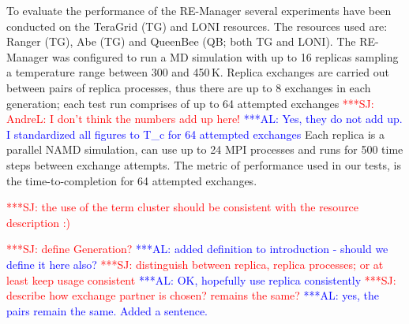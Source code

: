 \documentclass{rspublic}
\newcommand{\alnote}[1]{ {\textcolor{blue} { ***AL: #1 }}}
\newcommand{\jhanote}[1]{ {\textcolor{red} { ***SJ: #1 }}}
\newcommand{\alnote}[1]{}
\newcommand{\jhanote}[1]{}
\begin{document}
To evaluate the performance of the RE-Manager several experiments have
been conducted on the TeraGrid (TG) and LONI resources. The resources
used are: Ranger (TG), Abe (TG) and QueenBee (QB; both TG and LONI).
The RE-Manager was configured to run a MD simulation with up to 16
replicas sampling a temperature range between 300 and 450\,K. Replica
exchanges are carried out between pairs of replica processes, thus
there are up to 8 exchanges in each generation; each test run comprises
of up to 64 attempted exchanges\jhanote{AndreL: I don't think the
  numbers add up here!}  \alnote{Yes, they do not add up. I
  standardized all figures to T\_c for 64 attempted exchanges} Each
replica is a parallel NAMD simulation, can use up to 24 MPI processes
and runs for 500 time steps between exchange attempts. The metric of
performance used in our tests, is the time-to-completion for 64
attempted exchanges.

\jhanote{the use of the term cluster should be consistent with the
  resource description :)}


\jhanote{define Generation?}  \alnote{added definition to introduction
  - should we define it here also?}  \jhanote{distinguish between
  replica, replica processes; or at least keep usage consistent}
\alnote{OK, hopefully use replica consistently} \jhanote{describe how
  exchange partner is chosen? remains the same?}\alnote{yes, the pairs
  remain the same. Added a sentence.}



\end{document}
